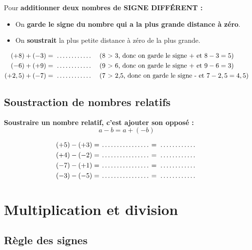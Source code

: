 \begin{proprietebox}
Pour \textbf{additionner deux nombres de SIGNE DIFFÉRENT :}
\begin{itemize}[label = \textbullet]
\item On \textbf{garde le signe du nombre qui a la plus grande distance à zéro}.
\item On \textbf{soustrait} la plus petite distance à zéro de la plus grande.
\end{itemize}
\end{proprietebox}

\begin{examplebox}
\begin{align*}
(+8) + (-3) &= \trous{2cm} \quad \text{(8 > 3, donc on garde le signe + et } 8 - 3 = 5\text{)} \\
(-6) + (+9) &= \trous{2cm} \quad \text{(9 > 6, donc on garde le signe + et } 9 - 6 = 3\text{)} \\
(+2,5) + (-7) &= \trous{2cm} \quad \text{(7 > 2,5, donc on garde le signe - et } 7 - 2,5 = 4,5\text{)}
\end{align*}
\end{examplebox}

\subsection{Soustraction de nombres relatifs}

\begin{proprietebox}
\textbf{Soustraire un nombre relatif, c'est ajouter son opposé :}
$$a - b = a + (-b)$$
\end{proprietebox}

\begin{examplebox}
\begin{align*}
(+5) - (+3) &= \trous{2.5cm} = \trous{2cm} \\
(+4) - (-2) &= \trous{2.5cm} = \trous{2cm} \\
(-7) - (+1) &= \trous{2.5cm} = \trous{2cm} \\
(-3) - (-5) &= \trous{2.5cm} = \trous{2cm}
\end{align*}
\end{examplebox}

\section{Multiplication et division}

\subsection{Règle des signes}

